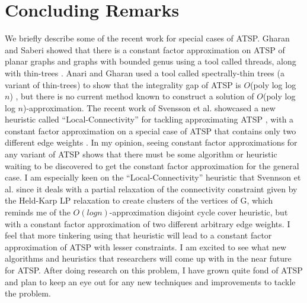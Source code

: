 \documentclass[oneside]{projectpaper} %
\begin{document}
\section{Concluding Remarks}
We briefly describe some of the recent work for special cases of ATSP.  Gharan and Saberi showed that there is a constant factor approximation on ATSP of planar graphs and graphs with bounded genus using a tool called threads, along with thin-trees \cite{GS11}. Anari and Gharan used a tool called spectrally-thin trees (a variant of thin-trees) to show that the integrality gap of ATSP is $O$(poly log log $n$) \cite{AG15}, but there is no current method known to construct a solution of $O$(poly log log $n$)-approximation. The recent work of Svensson et al. showcased a new heuristic called ``Local-Connectivity'' for tackling approximating ATSP \cite{Sve15}, with a constant factor approximation on a special case of ATSP that contains only two different edge weights \cite{STV16}. \newline
\indent In my opinion, seeing constant factor approximations for any variant of ATSP shows that there must be some algorithm or heuristic waiting to be discovered to get the constant factor approximation for the general case. I am especially keen on the ``Local-Connectivity'' heuristic that Svennson et al. \cite{Sve15} since it deals with a partial relaxation of the connectivity constraint given by the Held-Karp LP relaxation to create clusters of the vertices of G, which reminds me of the $O(logn)$-approximation disjoint cycle cover heuristic, but with a constant factor approximation of two different arbitrary edge weights. I feel that more tinkering using that heuristic will lead to a constant factor approximation of ATSP with lesser constraints. I am excited to see what new algorithms and heuristics that researchers will come up with in the near future for ATSP. After doing research on this problem, I have grown quite fond of ATSP and plan to keep an eye out for any new techniques and improvements to tackle the problem.

\nocite{*}


\end{document}
